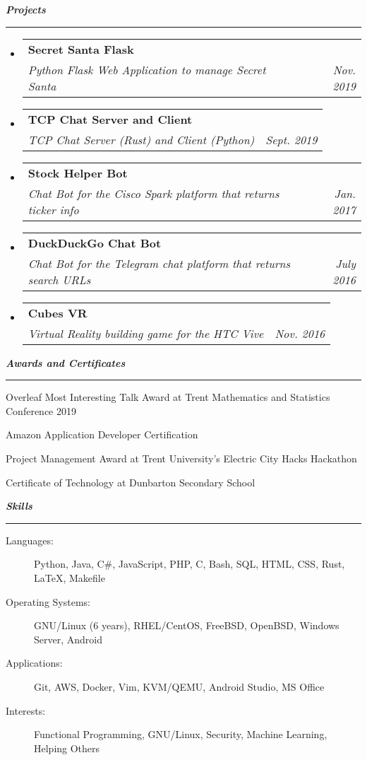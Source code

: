 \documentclass[letterpaper,11pt]{article}
\makeatletter
\newcommand{\mysection}[1]{\vspace{5pt} {\bfseries \textsl{#1}} \\ {\color{gray} \rule[5pt]{\textwidth}{1pt}}}
\newcommand{\ressubheading}[4]{\begin{tabular*}{6.5in}{l@{\extracolsep{\fill}}r}
        \textbf{#1} & #2 \\
        \textit{#3} & \textit{#4} \\
\end{tabular*}\vspace{-6pt}}
\makeatother
\begin{document}
\mysection{Projects}
\begin{itemize}
    \item
        \ressubheading{Secret Santa Flask}{}{Python Flask Web Application to manage Secret Santa}{Nov. 2019}
    \item
        \ressubheading{TCP Chat Server and Client}{}{TCP Chat Server (Rust) and Client (Python)}{Sept. 2019}
    \item
        \ressubheading{Stock Helper Bot}{}{Chat Bot for the Cisco Spark platform that returns ticker info}{Jan. 2017}
    \item
        \ressubheading{DuckDuckGo Chat Bot}{}{Chat Bot for the Telegram chat platform that returns search URLs}{July 2016}
    \item
        \ressubheading{Cubes VR}{}{Virtual Reality building game for the HTC Vive}{Nov. 2016}

\end{itemize}

\mysection{Awards and Certificates}
\begin{description}
    \item Overleaf Most Interesting Talk Award at Trent Mathematics and Statistics Conference 2019
    \item Amazon Application Developer Certification
    \item Project Management Award at Trent University's Electric City Hacks Hackathon
    \item Certificate of Technology at Dunbarton Secondary School
\end{description}

\mysection{Skills}
\begin{description}
    \item[Languages:]
        Python, Java, C\#, JavaScript, PHP, C, Bash, SQL, HTML, CSS, Rust, \LaTeX{}, Makefile
    \item[Operating Systems:]
        GNU/Linux (6 years), RHEL/CentOS, FreeBSD, OpenBSD, Windows Server, Android
    \item[Applications:]
        Git, AWS, Docker, Vim, KVM/QEMU, Android Studio, MS Office
    \item[Interests:]
        Functional Programming, GNU/Linux, Security, Machine Learning, Helping Others
\end{description}
\end{document}
